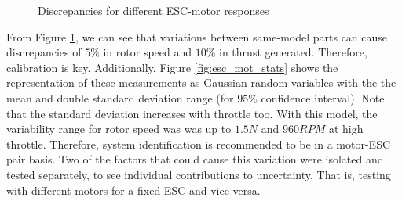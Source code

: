 \begin{figure}[!tbp]
  \centering
  \caption{Discrepancies for different ESC-motor responses
  \label{fig:esc_discrepancies_overall}}
\end{figure}

From Figure \ref{fig:esc_discrepancies_overall}, we can see that variations between same-model parts can cause discrepancies of $5\%$ in rotor speed and $10\%$ in thrust generated. Therefore, calibration is key. Additionally, Figure \ref{fig:esc_mot_stats} shows the representation of these measurements as Gaussian random variables with the the mean and double standard deviation range (for $95\%$ confidence interval). Note that the standard deviation increases with throttle too. With this model, the variability range for rotor speed was was up to $1.5N$ and $960RPM$ at high throttle. Therefore, system identification is recommended to be in a motor-ESC pair basis. Two of the factors that could cause this variation were isolated and tested separately, to see individual contributions to uncertainty. That is, testing with different motors for a fixed ESC and vice versa. 




